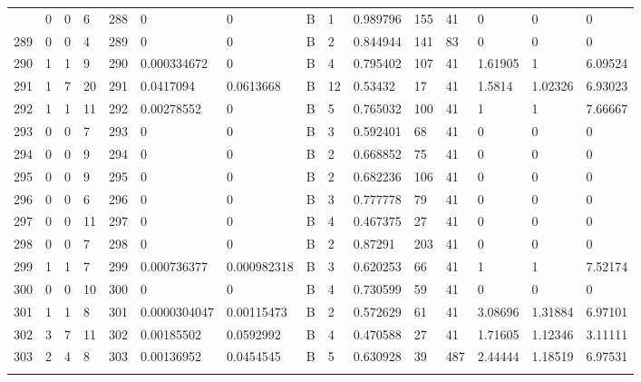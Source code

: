 \begin{latin}
\begin{longtable}{lllllllllllllll}
\begin{comment}
	288 & 0  & 0   & 6  & 288 & 0              & 0              & B & 1  & 0.989796 & 155  & 41   & 0       & 0       & 0       \\
	289 & 0  & 0   & 4  & 289 & 0              & 0              & B & 2  & 0.844944 & 141  & 83   & 0       & 0       & 0       \\
	290 & 1  & 1   & 9  & 290 & 0.000334672    & 0              & B & 4  & 0.795402 & 107  & 41   & 1.61905 & 1       & 6.09524 \\
	291 & 1  & 7   & 20 & 291 & 0.0417094      & 0.0613668      & B & 12 & 0.53432  & 17   & 41   & 1.5814  & 1.02326 & 6.93023 \\
	292 & 1  & 1   & 11 & 292 & 0.00278552     & 0              & B & 5  & 0.765032 & 100  & 41   & 1       & 1       & 7.66667 \\
	293 & 0  & 0   & 7  & 293 & 0              & 0              & B & 3  & 0.592401 & 68   & 41   & 0       & 0       & 0       \\
	294 & 0  & 0   & 9  & 294 & 0              & 0              & B & 2  & 0.668852 & 75   & 41   & 0       & 0       & 0       \\
	295 & 0  & 0   & 9  & 295 & 0              & 0              & B & 2  & 0.682236 & 106  & 41   & 0       & 0       & 0       \\
	296 & 0  & 0   & 6  & 296 & 0              & 0              & B & 3  & 0.777778 & 79   & 41   & 0       & 0       & 0       \\
	297 & 0  & 0   & 11 & 297 & 0              & 0              & B & 4  & 0.467375 & 27   & 41   & 0       & 0       & 0       \\
	298 & 0  & 0   & 7  & 298 & 0              & 0              & B & 2  & 0.87291  & 203  & 41   & 0       & 0       & 0       \\
	299 & 1  & 1   & 7  & 299 & 0.000736377    & 0.000982318    & B & 3  & 0.620253 & 66   & 41   & 1       & 1       & 7.52174 \\
	300 & 0  & 0   & 10 & 300 & 0              & 0              & B & 4  & 0.730599 & 59   & 41   & 0       & 0       & 0       \\
	301 & 1  & 1   & 8  & 301 & 0.0000304047   & 0.00115473     & B & 2  & 0.572629 & 61   & 41   & 3.08696 & 1.31884 & 6.97101 \\
	302 & 3  & 7   & 11 & 302 & 0.00185502     & 0.0592992      & B & 4  & 0.470588 & 27   & 41   & 1.71605 & 1.12346 & 3.11111 \\
	303 & 2  & 4   & 8  & 303 & 0.00136952     & 0.0454545      & B & 5  & 0.630928 & 39   & 487  & 2.44444 & 1.18519 & 6.97531 \\

\end{comment}
\end{longtable}
\end{latin}

